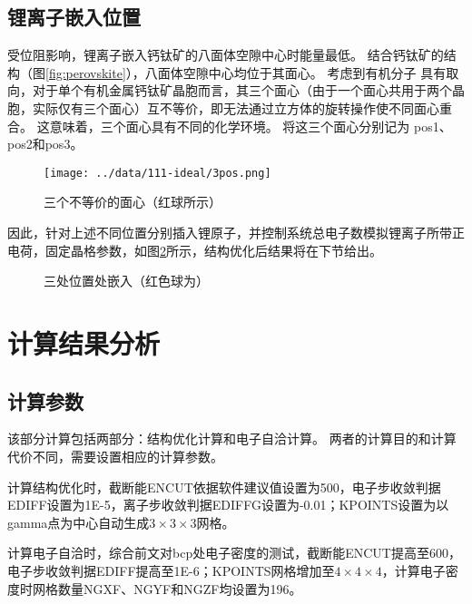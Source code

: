 \subsection{锂离子嵌入位置}

受位阻影响，锂离子嵌入钙钛矿的八面体空隙中心时能量最低。
结合钙钛矿的结构（图\ref{fig:perovskite}），八面体空隙中心均位于其面心。
考虑到有机分子  具有取向，对于单个有机金属钙钛矿晶胞而言，其三个面心（由于一个面心共用于两个晶胞，实际仅有三个面心）互不等价，即无法通过立方体的旋转操作使不同面心重合。
这意味着，三个面心具有不同的化学环境。
将这三个面心分别记为 pos1、pos2和pos3。

\begin{figure}[ht]
    \centering
    \texttt{[image: ../data/111-ideal/3pos.png]}
    \caption{三个不等价的面心（红球所示）}
    \label{fig:3pos}
\end{figure}


因此，针对上述不同位置分别插入锂原子，并控制系统总电子数模拟锂离子所带正电荷，固定晶格参数，如图\ref{fig:111-pos-poscar}所示，结构优化后结果将在下节给出。

\begin{figure}[htbp]
    \centering
    \caption{三处位置处嵌入（红色球为）}
    \label{fig:111-pos-poscar}
\end{figure}

\section{计算结果分析}

\subsection{计算参数}

该部分计算包括两部分：结构优化计算和电子自洽计算。
两者的计算目的和计算代价不同，需要设置相应的计算参数。

计算结构优化时，截断能ENCUT依据软件建议值设置为500，电子步收敛判据EDIFF设置为1E-5，离子步收敛判据EDIFFG设置为-0.01；KPOINTS设置为以gamma点为中心自动生成$3\times3\times3$网格。

计算电子自洽时，综合前文对bcp处电子密度的测试，截断能ENCUT提高至600，电子步收敛判据EDIFF提高至1E-6；KPOINTS网格增加至$4\times4\times4$，计算电子密度时网格数量NGXF、NGYF和NGZF均设置为196。

